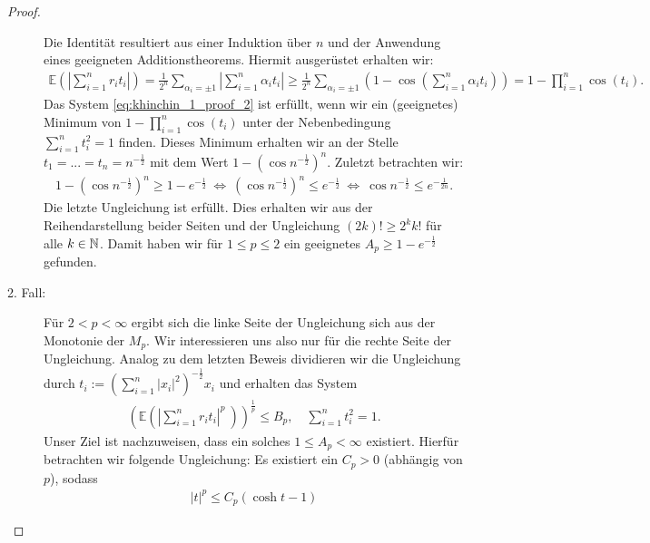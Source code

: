 \begin{proof}
\begin{description}
		Die Identität resultiert aus einer Induktion über $ n $ und der Anwendung eines geeigneten Additionstheorems.
		Hiermit ausgerüstet erhalten wir:
		\begin{align*}
			\mathbb{E}
			\left(\left|
			\sum \limits_{i = 1}^n  r_i t_i
			\right|\right) 
			=
			\frac{1}{2^n} \sum \limits_{\alpha_i = \pm 1}
			\left| \sum \limits_{i = 1}^n \alpha_i t_i \right|
			\geq 
			\frac{1}{2^n}
			\sum \limits_{\alpha_i = \pm 1}
			\left(
			1 - \cos
			\left(
			\sum \limits_{i = 1}^n \alpha_i t_i
			\right)
			\right)
			=
			1 - 
			\prod \limits_{i = 1}^n \cos(t_i).
		\end{align*}
		Das System \eqref{eq:khinchin_1_proof_2} ist erfüllt, wenn wir ein (geeignetes) Minimum von $ 1 - 
		\prod_{i = 1}^n \cos(t_i)$ unter der Nebenbedingung $ \sum_{i = 1}^n t_i^2 = 1 $ finden.
		Dieses Minimum erhalten wir an der Stelle $ t_1 = ... = t_n = n^{- \frac{1}{2}} $ mit dem Wert $ 1 -( \cos n^{-\frac{1}{2}})^n $.
		Zuletzt betrachten wir:
		\begin{align*}
			1 -( \cos n^{-\frac{1}{2}})^n \geq 1 - e^{-\frac{1}{2}}
			\ \Leftrightarrow \
			( \cos n^{-\frac{1}{2}})^n \leq e^{-\frac{1}{2}}
			\ \Leftrightarrow \
			\cos n^{-\frac{1}{2}} \leq e^{-\frac{1}{2n}}.
		\end{align*}
		Die letzte Ungleichung ist erfüllt. Dies erhalten wir aus der Reihendarstellung beider Seiten und der Ungleichung $ (2k)! \geq 2^k k! $ für alle $ k \in \mathbb{N} $.
		Damit haben wir für $ 1 \leq p \leq 2 $ ein geeignetes $ A_p \geq 1 - e^{-\frac{1}{2}} $ gefunden.
		\item[2. Fall:] 
		Für $ 2 < p < \infty $ ergibt sich
		die linke Seite der Ungleichung sich aus der Monotonie der $ M_p $.
		Wir interessieren uns also nur für die rechte Seite der Ungleichung. Analog zu dem letzten Beweis dividieren wir die Ungleichung durch $ t_i := \left(\sum_{i = 1}^n |x_i|^2\right)^{-\frac{1}{2}} x_i $ und erhalten das System
		\begin{align}\label{eq:khinchin_2_proof_1}
			\left(
			\mathbb{E} 
			\left(
			\left|
			\sum\limits_{i = 1}^n r_i t_i
			\right|^p \
			\right)
			\right)^\frac{1}{p}
			\leq B_p , \quad \sum \limits_{i = 1}^n t_i^2 = 1.
		\end{align}
		Unser Ziel ist nachzuweisen, dass ein solches $1 \leq A_p < \infty   $ existiert. Hierfür betrachten wir folgende Ungleichung:
		Es existiert ein $ C_p > 0 $ (abhängig von $ p $), sodass
		\begin{align*}
			|t|^p \leq C_p (\cosh t - 1)
		\end{align*} 

\end{description}
\end{proof}

